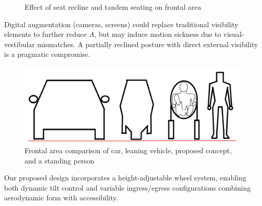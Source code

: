 \begin{figure}[h!]
    \centering
    \hfill
    \caption{Effect of seat recline and tandem seating on frontal area}
    \label{fig:FrontaAreaGraphicsComparison}
\end{figure}

Digital augmentation (cameras, screens) could replace traditional visibility elements to further reduce \(A\), but may induce motion sickness due to visual-vestibular mismatches. A partially reclined posture with direct external visibility is a pragmatic compromise.

\begin{figure}[h!]
    \centering
    \includegraphics[width=0.8\linewidth]{Figures/ch4_frontComparisonVehicle.png}
    \caption{Frontal area comparison of car, leaning vehicle, proposed concept, and a standing person}
    \label{fig:frontal_comparison}
\end{figure}

Our proposed design incorporates a height-adjustable wheel system, enabling both dynamic tilt control and variable ingress/egress configurations combining aerodynamic form with accessibility.

